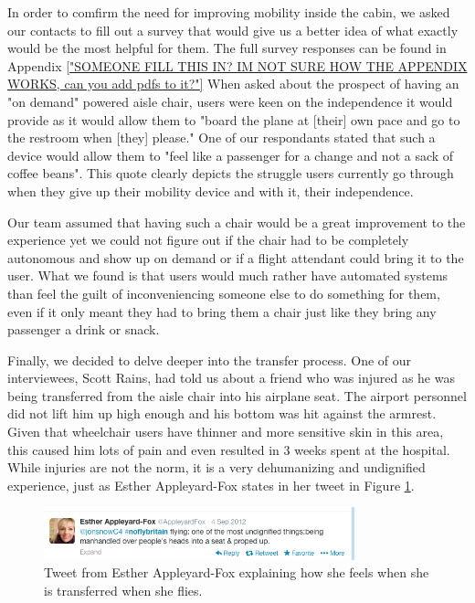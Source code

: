 In order to comfirm the need for improving mobility inside the cabin, we asked our contacts to fill out a survey that would give us a better idea of what exactly would be the most helpful for them. The full survey responses can be found in Appendix \ref{"SOMEONE FILL THIS IN? IM NOT SURE HOW THE APPENDIX WORKS, can you add pdfs to it?"} 
When asked about the prospect of having an "on demand"  powered aisle chair, users were keen on the independence it would provide as it would allow them to "board the plane at [their] own pace and go to the restroom when [they] please." One of our respondants stated that such a device would allow them to "feel like a passenger for a change and not a sack of coffee beans". This quote clearly depicts the struggle users currently go through when they give up their mobility device and with it, their independence.

Our team assumed that having such a chair would be a great improvement to the experience yet we could not figure out if the chair had to be completely autonomous and show up on demand or if a flight attendant could bring it to the user. What we found is that users would much rather have automated systems than feel the guilt of inconveniencing someone else to do something for them, even if it only meant they had to bring them a chair just like they bring any passenger a drink or snack. 

Finally, we decided to delve deeper into the transfer process. One of our interviewees, Scott Rains, had told us about a friend who was injured as he was being transferred from the aisle chair into his airplane seat. The airport personnel did not lift him up high enough and his bottom was hit against the armrest. Given that wheelchair users have thinner and more sensitive skin in this area, this caused him lots of pain and even resulted in 3 weeks spent at the hospital. While injuries are not the norm, it is a very dehumanizing and undignified experience, just as Esther Appleyard-Fox states in her tweet in Figure \ref{fig:MobilityTweet.png}. 


\begin{figure}[h]
  \centering
     \includegraphics[width=9cm]{images/MobilityTweet.png}
   \caption{Tweet from Esther Appleyard-Fox explaining how she feels when she is transferred when she flies. }
  \label{fig:MobilityTweet.png}
\end{figure}


